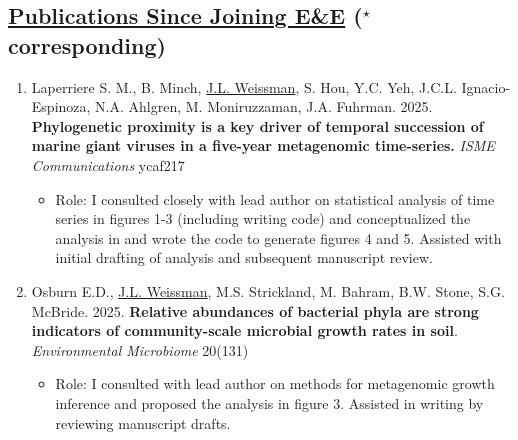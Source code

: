 \documentclass[]{res}
\begin{document}
 
 \small
{} %
 
 

\address{{\bf pronouns:} they/them/theirs {\emph{or}} she/her/hers\\ {\bf email:} jackie.weissman@stonybrook.edu}
\address{{\bf website:} https://microbialgamut.com/}%

 
\begin{resume} 
 

 \section{\underline{Publications Since Joining E\&E} ($^\star$corresponding)} \vspace{1mm}
 

\begin{enumerate}[leftmargin=*]
 \setlength\itemsep{0.2em}
 
 \item Laperriere S. M., B. Minch,  \underline{J.L. Weissman}, S. Hou, Y.C. Yeh, J.C.L. Ignacio-Espinoza, N.A. Ahlgren, M. Moniruzzaman, J.A. Fuhrman. 2025. {\bf Phylogenetic proximity is a key driver of temporal succession of marine giant viruses in a five-year metagenomic time-series.} \emph{ISME Communications} ycaf217
 
 \begin{itemize}
 	\item Role: I consulted closely with lead author on statistical analysis of time series in figures 1-3 (including writing code) and conceptualized the analysis in and wrote the code to generate figures 4 and 5. Assisted with initial drafting of analysis and subsequent manuscript review. 
 \end{itemize}
 
\item Osburn E.D., \underline{J.L. Weissman}, M.S. Strickland, M. Bahram, B.W. Stone, S.G. McBride. 2025. {\bf Relative abundances of bacterial phyla are strong indicators of community-scale microbial growth rates in soil}. \emph{Environmental Microbiome} 20(131)

 \begin{itemize}
 	\item Role: I consulted with lead author on methods for metagenomic growth inference and proposed the analysis in figure 3. Assisted in writing by reviewing manuscript drafts.
 \end{itemize}
 

\end{enumerate}
\end{resume}
\end{document}
